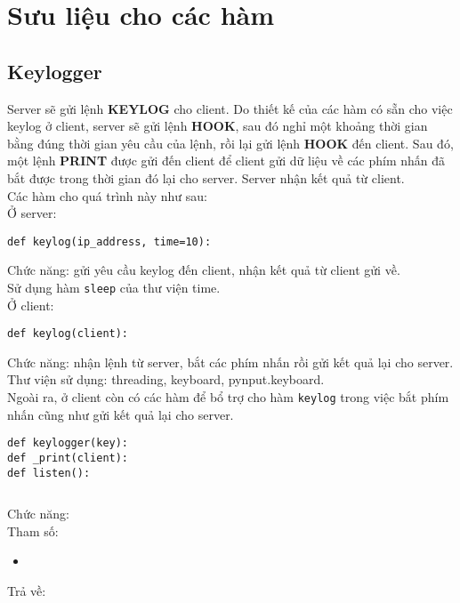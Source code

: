 \section{Sưu liệu cho các hàm}





\subsection{Keylogger}
Server sẽ gửi lệnh \textbf{KEYLOG} cho client. Do thiết kế của các hàm có sẵn cho việc keylog ở client, server sẽ gửi lệnh \textbf{HOOK}, sau đó nghỉ một khoảng thời gian bằng đúng thời gian yêu cầu của lệnh, rồi lại gửi lệnh \textbf{HOOK} đến client. Sau đó, một lệnh \textbf{PRINT} được gửi đến client để client gửi dữ liệu về các phím nhấn đã bắt được trong thời gian đó lại cho server. Server nhận kết quả từ client.\\
Các hàm cho quá trình này như sau:\\
Ở server:
\begin{lstlisting}
def keylog(ip_address, time=10):
\end{lstlisting}
Chức năng: gửi yêu cầu keylog đến client, nhận kết quả từ client gửi về.\\
Sử dụng hàm \lstinline{sleep} của thư viện time.\\
Ở client:
\begin{lstlisting}
def keylog(client):
\end{lstlisting}
Chức năng: nhận lệnh từ server, bắt các phím nhấn rồi gửi kết quả lại cho server.\\
Thư viện sử dụng: threading, keyboard, pynput.keyboard.\\
Ngoài ra, ở client còn có các hàm để bổ trợ cho hàm \lstinline{keylog} trong việc bắt phím nhấn cũng như gửi kết quả lại cho server.
\begin{lstlisting}
def keylogger(key):
def _print(client):
def listen():
\end{lstlisting}

\begin{lstlisting}

\end{lstlisting}
Chức năng: \\
Tham số: 
\begin{itemize}
\item \lstinline{}
\end{itemize}
Trả về: 

\lstinline{}